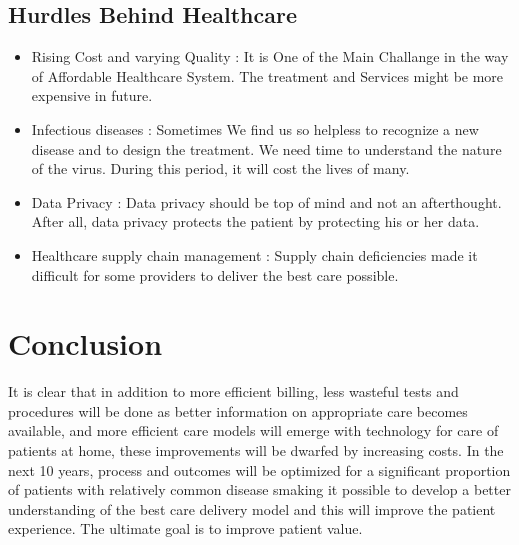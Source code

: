 \documentclass[12pt]{article}
\begin{document}
\subsection{Hurdles Behind Healthcare}
\begin{itemize}
 
\item[\ding{111}] Rising Cost and varying Quality : It is One of the Main Challange in the way of Affordable Healthcare System. The treatment and Services might be more expensive in future.

\item[\ding{111}] Infectious diseases : Sometimes We find us so helpless to recognize a new disease and to design the treatment. We need time to understand the nature of the virus. During this period, it will cost the lives of many.

\item[\ding{111}] Data Privacy : Data privacy should be top of mind and not an afterthought. After all, data privacy protects the patient by protecting his or her data.

\item[\ding{111}] Healthcare supply chain management : Supply chain deficiencies made it difficult for some providers to deliver the best care possible.
 
\end{itemize}
 
\section{Conclusion}
It is clear that in addition to more efficient billing, less wasteful tests and procedures will be done as better information on appropriate care becomes available, and more efficient care models will emerge with technology for care of patients at home, these improvements will be dwarfed by increasing costs. In the next 10 years, process and outcomes will be optimized for a significant proportion of patients with relatively common disease smaking it possible to develop a better understanding of the best care delivery model and this will improve the patient experience.  The ultimate goal is to improve patient value.
\end{document}
